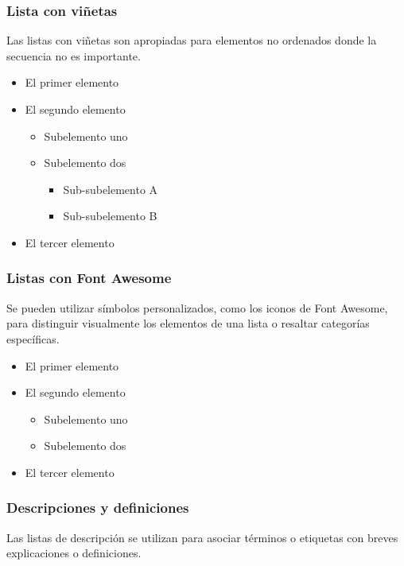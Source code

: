 \subsubsection{Lista con viñetas}

Las listas con viñetas son apropiadas para elementos no ordenados donde la secuencia no es importante.

\begin{itemize}
	\item El primer elemento
	\item El segundo elemento
	\begin{itemize}
		\item Subelemento uno
		\item Subelemento dos
		\begin{itemize}
			\item Sub-subelemento A
			\item Sub-subelemento B
		\end{itemize}
	\end{itemize}
	\item El tercer elemento
\end{itemize}



\subsubsection{Listas con Font Awesome}
Se pueden utilizar símbolos personalizados, como los iconos de Font Awesome, para distinguir visualmente los elementos de una lista o resaltar categorías específicas.

\begin{itemize}
	\item[\footnotesize\faRobot] El primer elemento
	\item[\footnotesize\faRobot] El segundo elemento
	\begin{itemize}
		\item[\footnotesize\faMicrochip] Subelemento uno
		\item[\footnotesize\faMicrochip] Subelemento dos
	\end{itemize}
	\item[\footnotesize\faRobot] El tercer elemento
\end{itemize}


\subsubsection{Descripciones y definiciones}
Las listas de descripción se utilizan para asociar términos o etiquetas con breves explicaciones o definiciones.

